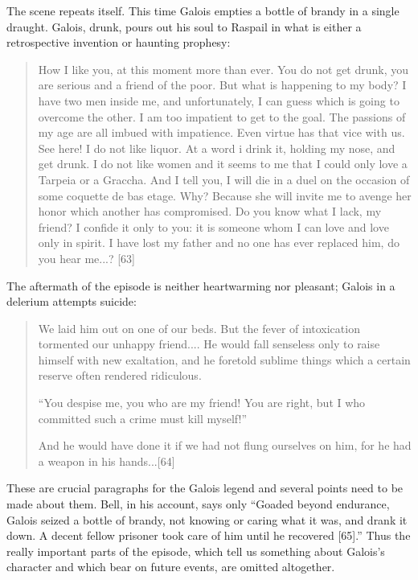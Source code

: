 \documentclass[12pt]{article}
\begin{document}
The scene repeats itself. This time Galois empties a bottle of brandy in a single draught. Galois, drunk, pours out his soul to Raspail in what is either a retrospective invention or haunting prophesy:

\begin{quote}
How I like you, at this moment more than ever. You do not get drunk, you are serious and a friend of the poor. But what is happening to my body? I have two men inside me, and unfortunately, I can guess which is going to overcome the other. I am too impatient to get to the goal. The passions of my age are all imbued with impatience. Even virtue has that vice with us. See here! I do not like liquor. At a word i drink it, holding my nose, and get drunk. I do not like women and it seems to me that I could only love a Tarpeia or a Graccha. And I tell you, I will die in a duel on the occasion of some coquette de bas etage. Why? Because she will invite me to avenge her honor which another has compromised. Do you know what I lack, my friend? I confide it only to you: it is someone whom I can love and love only in spirit. I have lost my father and no one has ever replaced him, do you hear me...? [63]

\end{quote}

The aftermath of the episode is neither heartwarming nor pleasant; Galois in a delerium attempts suicide:

\begin{quotation}
We laid him out on one of our beds. But the fever of intoxication tormented our unhappy friend.... He would fall senseless only to raise himself with new exaltation, and he foretold sublime things which a certain reserve often rendered ridiculous. 

``You despise me, you who are my friend! You are right, but I who committed such a crime must kill myself!'' 

And he would have done it if we had not flung ourselves on him, for he had a weapon in his hands...[64]
\end{quotation}
These are crucial paragraphs for the Galois legend and several points need to be made about them. Bell, in his account, says only ``Goaded beyond endurance, Galois seized a bottle of brandy, not knowing or caring what it was, and drank it down. A decent fellow prisoner took care of him until he recovered [65].'' Thus the really important parts of the episode, which tell us something about Galois's character and which bear on future events, are omitted altogether.
\end{document}
